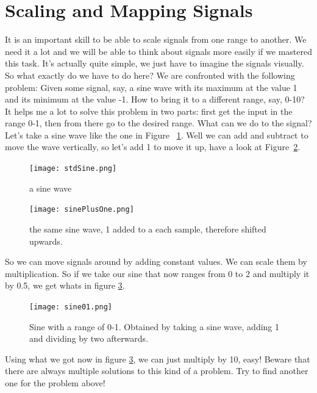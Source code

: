 \section{Scaling and Mapping Signals}
It is an important skill to be able to scale signals from one range to another. We need it a lot and we will be able to think about signals more easily if we mastered this task. It's actually quite simple, we just have to imagine the signals visually.\\
So what exactly do we have to do here? We are confronted with the following problem: Given some signal, say, a sine wave with its maximum at the value 1 and its minimum at the value -1. How to bring it to a different range, say, 0-10?\\
It helps me a lot to solve this problem in two parts: first get the input in the range 0-1, then from there go to the desired range. What can we do to the signal? Let's take a sine wave like the one in Figure ~\ref{fig:aSine}. Well we can add and subtract to move the wave vertically, so let's add 1 to move it up, have a look at Figure~\ref{fig:aShiftedSine}.

\begin{figure}[H]
	\centering
	\texttt{[image: stdSine.png]}
	\caption[a sine wave]
	{a sine wave}
	\label{fig:aSine}
\end{figure}

\begin{figure}[H]
	\centering
	\texttt{[image: sinePlusOne.png]}
	\caption[a sine wave]
	{the same sine wave, 1 added to a each sample, therefore shifted upwards.}
	\label{fig:aShiftedSine}
\end{figure}

So we can move signals around by adding constant values. We can scale them by multiplication. So if we take our sine that now ranges from 0 to 2 and multiply it by 0.5, we get whats in figure \ref{fig:sine01}.

\begin{figure}[H]
 	\centering
 	\texttt{[image: sine01.png]}
 	\caption[sine 0 to 1]
 	{Sine with a range of 0-1. Obtained by taking a sine wave, adding 1 and dividing by two afterwards.}
 	\label{fig:sine01}
 \end{figure}

\hspace{1cm}

Using what we got now in figure \ref{fig:sine01}, we can just multiply by 10, easy! Beware that there are always multiple solutions to this kind of a problem. Try to find another one for the problem above!

